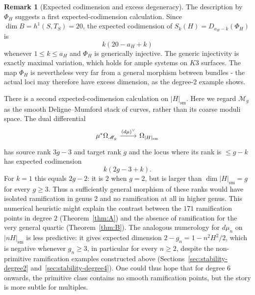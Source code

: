 \documentclass[a4paper,12pt,twoside,reqno]{amsart}
\numberwithin{equation}{section}
\theoremstyle{plain}
\theoremstyle{definition}
\newtheorem{remark}[theorem]{Remark}
\newcommand{\sm}{\mathrm{sm}}
\newcommand{\Mmod}{\mathscr{M}}
\theoremstyle{plain}
\theoremstyle{definition}
\begin{document}
\begin{remark}[Expected codimension and excess degeneracy]\label{rem:jumping-expected}
The description by $\Phi_H$ suggests a first expected-codimension calculation. Since $\dim B=h^1(S,T_S)=20$, the expected codimension of $S_k(H)=D_{a_H-k}(\Phi_H)$ is
\[
k(20-a_H+k)
\]
whenever $1\le k\le a_H$ and $\Phi_H$ is generically injective. The generic injectivity is exactly maximal variation, which holds for ample systems on $K3$ surfaces. The map $\Phi_H$ is nevertheless very far from a general morphism between bundles - the actual loci may therefore have excess dimension, as the degree-$2$ example shows.

There is a second expected-codimension calculation on $|H|_{\sm}$. Here we regard $\Mmod_g$ as the smooth Deligne--Mumford stack of curves, rather than its coarse moduli space. The dual differential
\[
\begin{tikzcd}
\mu^*\Omega_{\Mmod_g} \arrow[r, "(d\mu)^\vee"] & \Omega_{|H|_{\sm}}
\end{tikzcd}
\]
has source rank $3g-3$ and target rank $g$ and the locus where its rank is $\le g-k$ has expected codimension
\[
k(2g-3+k).
\]
For $k=1$ this equals $2g-2$: it is $2$ when $g=2$, but is larger than $\dim |H|_{\sm}=g$ for every $g\ge3$. Thus a sufficiently general morphism of these ranks would have isolated ramification in genus $2$ and no ramification at all in higher genus. This numerical heuristic might explain the contrast between the $171$ ramification points in degree $2$ (Theorem~\ref{thm:A}) and the absence of ramification for the very general quartic (Theorem~\ref{thm:B}). The analogous numerology for $d\mu_n$ on $|nH|_{\sm}$ is less predictive: it gives expected dimension $2-g_n=1-n^2H^2/2$, which is negative whenever $g_n\ge3$, in particular for every $n\ge2$, despite the non-primitive ramification examples constructed above (Sections~\ref{sec:stability-degree2} and~\ref{sec:stability-degree4}). One could thus hope that for degree $6$ onwards, the primitive class contains no smooth ramification points, but the story is more subtle for multiples.
\end{remark}
\end{document}

